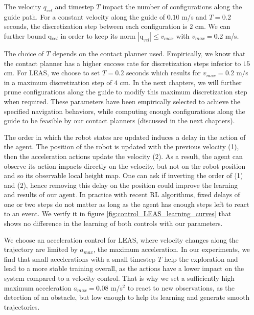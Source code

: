 The velocity $q_{vel}$ and timestep $T$ impact the number of configurations along the guide path. For a constant velocity along the guide of $0.10$ m/s and $T=0.2$ seconds, the discretization step between each configuration is $2$ cm. 
We can further bound q$_{vel}$ in order to keep its norm $|\mbox{q}_{vel}| \leq v_{max}$ with $v_{max}=0.2$ m/s. %

The choice of $T$ depends on the contact planner used. 
Empirically, we know that the contact planner \cite{AcyclicCP} has a higher success rate for discretization steps inferior to $15$ cm.
For LEAS, we choose to set $T=0.2$ seconds which results for $v_{max}=0.2$ m/s in a maximum discretization step of $4$ cm.
In the next chapters, we will further prune configurations along the guide to modify this maximum discretization step when required.
These parameters have been empirically selected to achieve the specified navigation behaviors, while computing enough configurations along the guide to be feasible by our contact planners (discussed in the next chapters).

The order in which the robot states are updated induces a delay in the action of the agent. 
The position of the robot is updated with the previous velocity (1), then the acceleration actions update the velocity (2). As a result, the agent can observe its action impacts directly on the velocity, but not on the robot position and so its observable local height map.
One can ask if inverting the order of (1) and (2), hence removing this delay on the position could improve the learning and results of our agent. 
In practice with recent RL algorithms, fixed delays of one or two steps do not matter \cite{RL_delayed_explanation} as long as the agent has enough steps left to react to an event. We verify it in figure \ref{fig:control_LEAS_learning_curves} that shows no difference in the learning of both controls with our parameters.

We choose an acceleration control for LEAS, where velocity changes along the trajectory are limited by $a_{max}$, the maximum acceleration.
In our experiments, we find that small accelerations with a small timestep $T$ help the exploration and lead to a more stable training overall, as the actions have a lower impact on the system compared to a velocity control.
That is why we set a sufficiently high maximum acceleration $a_{max}=0.08$ m/s$^2$ to react to new observations, as the detection of an obstacle, but low enough to help its learning and generate smooth trajectories.

